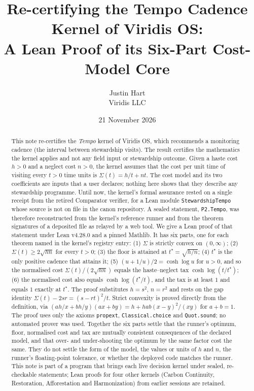 \documentclass[11pt]{article}
\title{Re-certifying the Tempo Cadence Kernel of Viridis OS:\\ A Lean Proof of its Six-Part Cost-Model Core}
\author{Justin Hart\\ Viridis LLC}
\date{21 November 2026}
\theoremstyle{definition}
\theoremstyle{remark}
\begin{document}
\maketitle

\begin{abstract}
This note re-certifies the \emph{Tempo} kernel of Viridis OS, which recommends a monitoring cadence (the interval between
stewardship visits). The result certifies the mathematics the kernel applies and not any field input or stewardship outcome.
Given a haste cost $h>0$ and a neglect cost $n>0$, the kernel assumes that the cost per unit time of visiting every $t>0$
time units is $\Sigma(t)=h/t+nt$. The cost model and its two coefficients are inputs that a user declares; nothing here
shows that they describe any stewardship programme. Until now, the kernel's formal assurance rested on a single receipt
from the retired Comparator verifier, for a Lean module \texttt{StewardshipTempo} whose source is not on file in the canon
repository. A sealed statement, \texttt{P2.Tempo}, was therefore reconstructed from the kernel's reference runner and
from the theorem signatures of a deposited file as relayed by a web tool. We give a Lean proof of that statement under
Lean v4.28.0 and a pinned Mathlib. It has six parts, one for each theorem named in the kernel's registry entry:
(1) $\Sigma$ is strictly convex on $(0,\infty)$;
(2) $\Sigma(t)\ge 2\sqrt{hn}$ for every $t>0$;
(3) the floor is attained at $t^\star=\sqrt{h/n}$;
(4) $t^\star$ is the only positive cadence that attains it;
(5) $(u+1/u)/2=\cosh\log u$ for $u>0$, and so the normalised cost $\Sigma(t)/(2\sqrt{hn})$ equals the haste--neglect tax $\cosh\log(t/t^\star)$;
(6) the normalised cost also equals $\cosh\log(t^\star/t)$, and the tax is at least $1$ and equals $1$ exactly at $t^\star$.
The proof substitutes $h=s^2$, $n=r^2$ and rests on the gap identity $\Sigma(t)-2sr=(s-rt)^2/t$. Strict convexity
is proved directly from the definition, via $(ah/x+bh/y)(ax+by)=h+hab(x-y)^2/(xy)$ for $a+b=1$.
The proof uses only the axioms \texttt{propext}, \texttt{Classical.choice} and \texttt{Quot.sound}; no automated prover was used.
Together the six parts settle that the runner's optimum, floor, normalised cost and tax are mutually consistent consequences
of the declared model, and that over- and under-shooting the optimum by the same factor cost the same.
They do not settle the form of the model, the values or units of $h$ and $n$, the runner's floating-point tolerance,
or whether the deployed code matches the runner. This note is part of a program that brings each live decision kernel
under sealed, re-checkable statements; Lean proofs for four other kernels (Carbon Continuity, Restoration, Afforestation and
Harmonization) from earlier sessions are retained.
\end{abstract}
\end{document}
